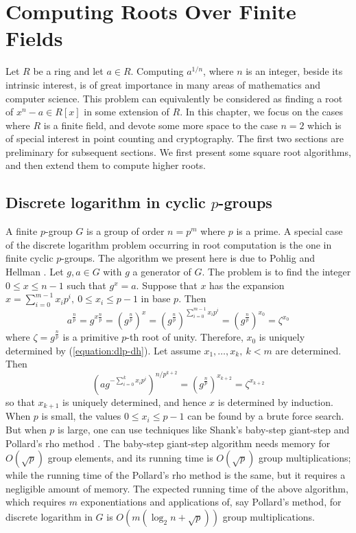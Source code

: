 
\chapter{Computing Roots Over Finite Fields}
\label{chapter:rootcomp}

Let $R$ be a ring and let $a \in R$. Computing $a^{1/n}$, where $n$ is an integer, beside its 
intrinsic interest, is of great importance in many areas of mathematics and computer science. This 
problem can equivalently be considered as finding a root of $x^n - a \in R[x]$ in some extension of 
$R$. In this chapter, we focus on the cases where $R$ is a finite field, and devote some more space 
to the case $n = 2$ which is of special interest in point counting and cryptography. The first two 
sections are preliminary for subsequent sections. We first present some square root algorithms, and 
then extend them to compute higher roots.



\section{Discrete logarithm in cyclic $p$-groups}
\label{section:dlp-cpgroups}

A finite $p$-group $G$ is a group of order $n = p^m$ where $p$ is a prime. A special case of the 
discrete logarithm problem occurring in root computation is the one in finite cyclic $p$-groups. The 
algorithm we present here is due to Pohlig and Hellman \cite{Pohlig1978}. Let $g, a \in G$ with $g$ 
a generator of $G$. The problem is to find the integer $0 \le x \le n - 1$ such that $g^x = a$. 
Suppose that $x$ has the expansion $x = \sum_{i = 0}^{m - 1}x_ip^i, \: 0 \le x_i \le p - 1$ in base 
$p$. Then
\begin{equation}
\label{equation:dlp-dh}
a^{\frac{n}{p}} = g^{x\frac{n}{p}} = (g^{\frac{n}{p}})^x = (g^{\frac{n}{p}})^{\sum_{i = 0}^{m - 
1}x_ip^i} = (g^{\frac{n}{p}})^{x_0} = \zeta^{x_0}
\end{equation}
where $\zeta = g^{\frac{n}{p}}$ is a primitive $p$-th root of unity. Therefore, $x_0$ is uniquely 
determined by (\ref{equation:dlp-dh}). Let assume $x_1, \dots, x_k, \: k < m$ are determined. Then 
$$
(ag^{-\sum_{i = 0}^{k}x_ip^i})^{n / p^{k + 2}} = (g^{\frac{n}{p}})^{x_{k + 2}} = \zeta^{x_{k + 2}}
$$
so that $x_{k + 1}$ is uniquely determined, and hence $x$ is determined by induction. When $p$ is 
small, the values $0 \le x_i \le p - 1$ can be found by a brute force search. But when $p$ is large, 
one can use techniques like Shank's baby-step giant-step \cite{Shank1971} and Pollard's rho method 
\cite{Pollard1978}. The baby-step giant-step algorithm needs memory for $O(\sqrt{p})$ group 
elements, and its running time is $O(\sqrt{p})$ group multiplications; while the running time of the 
Pollard's rho method is the same, but it requires a negligible amount of memory. The expected 
running time of the above algorithm, which requires $m$ exponentiations and applications of, say 
Pollard's method, for discrete logarithm in $G$ is $O(m(\log_2{n} + \sqrt{p}))$ group 
multiplications.







